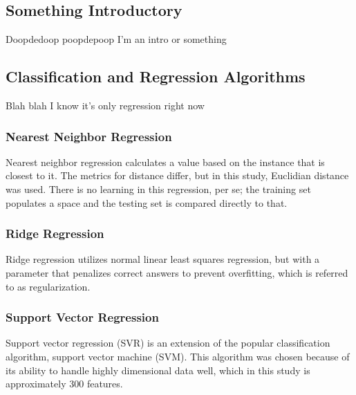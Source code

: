 \subsection{Something Introductory}
\label{sec:mlintro}

Doopdedoop poopdepoop I'm an intro or something

\subsection{Classification and Regression Algorithms}
\label{sec:algs}

Blah blah I know it's only regression right now

\subsubsection{Nearest Neighbor Regression}
\label{sec:nnreg}


Nearest neighbor regression calculates a value based on the instance that is
closest to it. The metrics for distance differ, but in this study, Euclidian
distance was used. There is no learning in this regression, per se; the
training set populates a space and the testing set is compared directly to
that. 

\subsubsection{Ridge Regression}
\label{sec:rreg}


Ridge regression utilizes normal linear least squares regression, but with a
parameter that penalizes correct answers to prevent overfitting, which is
referred to as regularization. 

\subsubsection{Support Vector Regression}
\label{sec:svr}


Support vector regression (SVR) is an extension of the popular classification
algorithm, support vector machine (SVM).  This algorithm was chosen because of
its ability to handle highly dimensional data well, which in this study is
approximately 300 features. 


